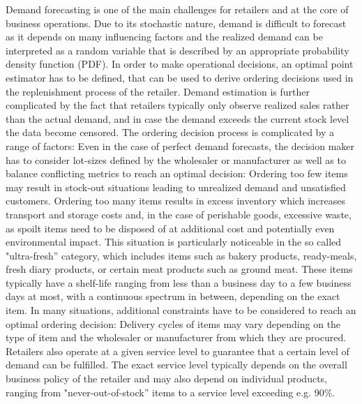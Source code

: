 \documentclass[BCOR=1mm, DIV=calc,10pt,
twoside=true,
twocolumn,
headings=normal]{scrartcl}
\begin{document}
Demand forecasting is one of the main challenges for retailers and at the core of business operations. Due to its stochastic nature, demand is difficult to forecast as it depends on many influencing factors and the realized demand can be interpreted as a random variable that is described by an appropriate probability density function (PDF). In order to make operational decisions, an optimal point estimator has to be defined, that can be used to derive ordering decisions used in the replenishment process of the retailer. Demand estimation is further complicated by the fact that retailers typically only observe realized sales rather than the actual demand, and in case the demand exceeds the current stock level the data become censored. The ordering decision process is complicated by a range of factors: Even in the case of perfect demand forecasts, the decision maker has to consider lot-sizes defined by the wholesaler or manufacturer as well as to balance conflicting metrics to reach an optimal decision: Ordering too few items may result in stock-out situations leading to unrealized demand and unsatisfied customers. Ordering too many items results in excess inventory which increases transport and storage costs and, in the case of perishable goods, excessive waste, as spoilt items need to be disposed of at additional cost and potentially even environmental impact. This situation is particularly noticeable in the so called "ultra-fresh'' category, which includes items such as bakery products, ready-meals, fresh diary products, or certain meat products such as ground meat. These items typically have a shelf-life ranging from less than a business day to a few business days at most, with a continuous spectrum in between, depending on the exact item. In many situations, additional constraints have to be considered to reach an optimal ordering decision: Delivery cycles of items may vary depending on the type of item and the wholesaler or manufacturer from which they are procured. Retailers also operate at a given service level to guarantee that a certain level of demand can be fulfilled. The exact service level typically depends on the overall business policy of the retailer and may also depend on individual products, ranging from "never-out-of-stock'' items to a service level exceeding e.g. 90\%.
\end{document}
